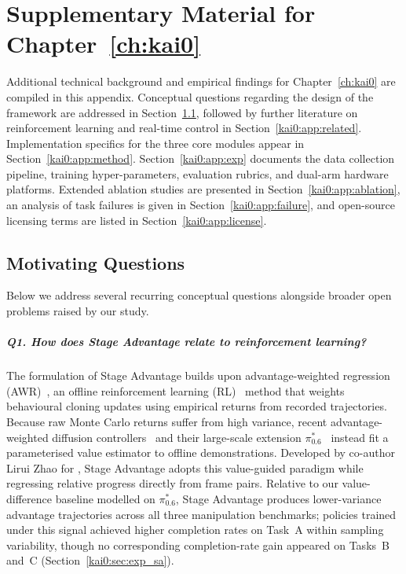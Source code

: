 \chapter{Supplementary Material for Chapter~\ref{ch:kai0}}\label{app:kai0}

Additional technical background and empirical findings for Chapter~\ref{ch:kai0} are compiled in this appendix. Conceptual questions regarding the design of the framework are addressed in Section~\ref{kai0:app:questions}, followed by further literature on reinforcement learning and real-time control in Section~\ref{kai0:app:related}. Implementation specifics for the three core modules appear in Section~\ref{kai0:app:method}. Section~\ref{kai0:app:exp} documents the data collection pipeline, training hyper-parameters, evaluation rubrics, and dual-arm hardware platforms. Extended ablation studies are presented in Section~\ref{kai0:app:ablation}, an analysis of task failures is given in Section~\ref{kai0:app:failure}, and open-source licensing terms are listed in Section~\ref{kai0:app:license}.

\section{Motivating Questions}\label{kai0:app:questions}

Below we address several recurring conceptual questions alongside broader open problems raised by our study.

\paragraph{Q1. How does Stage Advantage relate to reinforcement learning?}
The formulation of Stage Advantage builds upon advantage-weighted regression (AWR)~\cite{peng2019awr}, an offline reinforcement learning (RL)~\cite{sutton1998reinforcement} method that weights behavioural cloning updates using empirical returns from recorded trajectories. Because raw Monte Carlo returns suffer from high variance, recent advantage-weighted diffusion controllers~\cite{frans2025diffusion} and their large-scale extension $\pi^{*}_{0.6}$~\cite{amin2026pistar06} instead fit a parameterised value estimator to offline demonstrations. Developed by co-author Lirui Zhao for \chiz, Stage Advantage adopts this value-guided paradigm while regressing relative progress directly from frame pairs. Relative to our value-difference baseline modelled on $\pi^{*}_{0.6}$, Stage Advantage produces lower-variance advantage trajectories across all three manipulation benchmarks; policies trained under this signal achieved higher completion rates on Task~A within sampling variability, though no corresponding completion-rate gain appeared on Tasks~B and~C (Section~\ref{kai0:sec:exp_sa}).

